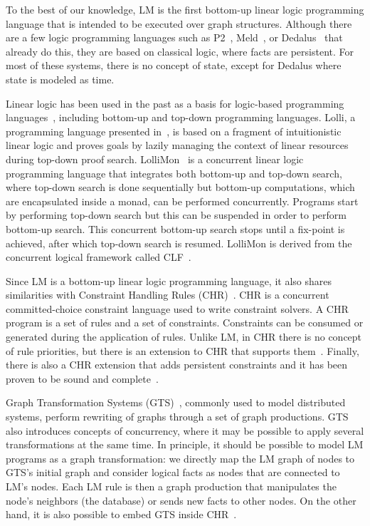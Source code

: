 
To the best of our knowledge, LM is the first bottom-up linear logic programming language
that is intended to be executed over graph structures. Although there are a few logic programming languages such as P2~\cite{Loo-condie-garofalakis-p2},
Meld~\cite{ashley-rollman-iclp09}, or Dedalus~\cite{Alvaro:EECS-2009-173} that already do this, they are based on classical logic, where facts are persistent. For most of these systems, there is no concept of state, except for Dedalus where state is modeled as time.

Linear logic has been used in the past as a basis for logic-based programming languages~\cite{Miller85anoverview}, including bottom-up and top-down programming languages. Lolli, a programming language presented in~\cite{Hodas94logicprogramming}, is based on a fragment of intuitionistic linear logic
and proves goals by lazily managing the context of linear resources during top-down proof search. LolliMon~\cite{Lopez:2005:MCL:1069774.1069778} is a concurrent linear logic programming language that integrates both bottom-up and top-down search, where top-down search is done sequentially but bottom-up computations, which are encapsulated inside a monad, can be performed concurrently. Programs start by performing top-down search but this can be suspended in order to perform bottom-up search. This concurrent bottom-up search stops until a fix-point is achieved, after which top-down search is resumed. LolliMon is derived from the concurrent logical framework called CLF~\cite{Watkins:2004uq,Cervesato02aconcurrent,Watkins03aconcurrent}.

Since LM is a bottom-up linear logic programming language, it also shares similarities with Constraint Handling Rules (CHR)~\cite{Betz:2005kx,Betz:2013:LBA:2422085.2422086}.
CHR is a concurrent committed-choice constraint language used to write constraint solvers. A CHR program is a set of rules and
a set of constraints. Constraints can be consumed or generated during the application of rules.
Unlike LM, in CHR there is no
concept of rule priorities, but there is an extension to CHR that supports them~\cite{DeKoninck:2007:URP:1273920.1273924}.
Finally, there is also a CHR extension that adds persistent constraints and it has been proven to be sound and complete~\cite{DBLP:journals/corr/abs-1007-3829}.

Graph Transformation Systems (GTS)~\cite{Ehrig:2004vn}, commonly used to model distributed systems, perform rewriting of graphs through
a set of graph productions. GTS also introduces
concepts of concurrency, where it may be possible to apply several transformations at the same time. In principle, it should be possible to model
LM programs as a graph transformation: we directly map the LM graph of nodes to GTS's initial graph and consider logical facts as nodes that are connected
to LM's nodes. Each LM rule is then a graph production that manipulates the node's neighbors (the database) or sends new facts to other nodes.
On the other hand, it is also possible to embed GTS inside CHR~\cite{Raiser:2011:AGT:1972935.1972938}.
